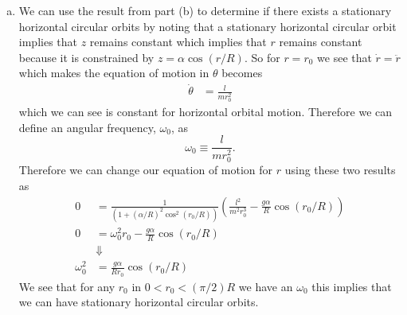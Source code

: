 \documentclass[11pt]{article}
\numberwithin{equation}{section}
\begin{document}
\begin{enumerate}[(a)]
\item
We can use the result from part (b) to determine if there exists a stationary horizontal
circular orbits by noting that a stationary horizontal circular orbit implies that $z$ 
remains constant which implies that $r$ remains constant because it is constrained by 
$z=\alpha\cos(r/R)$. So for $r=r_0$ we see that $\dot{r}=\ddot{r}$ which makes the equation of 
motion in $\theta$ becomes
\begin{align*}
\dot{\theta} &= \frac{l}{mr_0^2}
\end{align*}
which we can see is constant for horizontal orbital motion. Therefore we can define an 
angular frequency, $\omega_0$, as
\begin{equation}
\omega_0 \equiv \frac{l}{mr_0^2}.
\label{omega0}
\end{equation}
Therefore we can change our equation of motion for $r$ using these two results as
\begin{align*}
0 &= \frac{1}{\left(1 + \left(\alpha/R\right)^2\cos^2(r_0/R)\right)}\left(\frac{l^2}{m^2r_0^3} - \frac{g\alpha}{R}\cos(r_0/R)\right)\\
0 &= \omega_0^2r_0 - \frac{g\alpha}{R}\cos(r_0/R)\\
&\Downarrow\\
\omega_0^2 &= \frac{g\alpha}{Rr_0}\cos(r_0/R)
\end{align*}
We see that for any $r_0$ in $0<r_0<(\pi/2)R$ we have an $\omega_0$ this implies that we can
have stationary horizontal circular orbits.


\end{enumerate}
\end{document}
